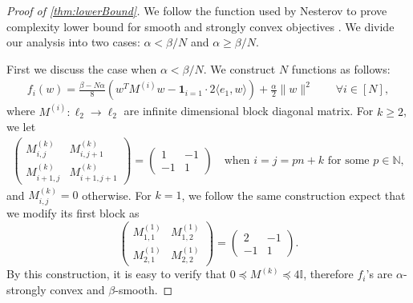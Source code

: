 \begin{proof}[Proof of \autoref{thm:lowerBound}]
    We follow the function used by Nesterov to prove complexity lower bound for smooth and strongly convex objectives \citep{nemirovsky1983problem,cvxopt_lecture,Bubeck15}. We divide our analysis into two cases: $\alpha < \beta/N$ and $\alpha \geq \beta/N$. 
    
    First we discuss the case when $\alpha < \beta/N$. We construct $N$ functions as follows:
    \begin{align}
        f_i( w ) = \frac{\beta - N \alpha}{8} \left( w^T M^{(i)} w - \mathbf{1}_{i=1} \cdot 2 \langle e_1, w \rangle \right) + \frac{\alpha}{2} \| w \|^2 \qquad \forall i \in [N],
    \end{align}
    where $M^{(i)} : \ell_2 \to \ell_2 $ are infinite dimensional block diagonal matrix. For $k \geq 2$, we let
    \begin{align}
        \begin{pmatrix}
            M^{(k)}_{i,j} & M^{(k)}_{i,j+1} \\
            M^{(k)}_{i+1,j} & M^{(k)}_{i+1,j+1}
        \end{pmatrix}
        = 
        \begin{pmatrix}
            1 & -1 \\
            -1 & 1
        \end{pmatrix}
        \quad \text{when $i =j = pn+k$ for some $p \in \mathbb{N}$},
    \end{align}
    and $M^{(k)}_{i,j} = 0$ otherwise. For $k=1$, we follow the same construction expect that we modify its first block as
    \[
        \begin{pmatrix}
            M^{(1)}_{1,1} & M^{(1)}_{1,2} \\
            M^{(1)}_{2,1} & M^{(1)}_{2,2}
        \end{pmatrix}
        = 
        \begin{pmatrix}
            2 & -1 \\
            -1 & 1
        \end{pmatrix}.
    \]
    By this construction, it is easy to verify that $ 0 \preceq M^{(k)} \preceq 4 \mathbb{I}$, therefore $f_i$'s are $\alpha$-strongly convex and $\beta$-smooth.
    

\end{proof}
